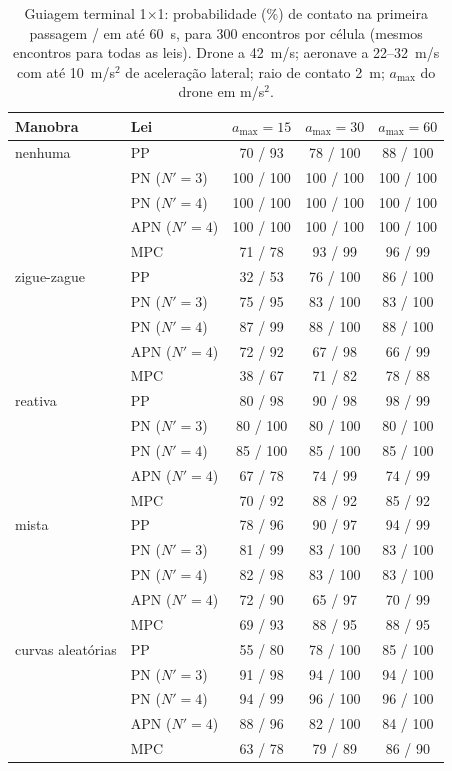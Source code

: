 \begin{table}[t]
\centering
\caption{Guiagem terminal 1$\times$1: probabilidade (\%) de contato na primeira passagem / em até 60~s, para
300 encontros por célula (mesmos encontros para todas as leis). Drone a 42~m/s; aeronave a 22--32~m/s com até
10~m/s$^2$ de aceleração lateral; raio de contato 2~m; $a_{\max}$ do drone em m/s$^2$.}
\label{tab:guiagem}
\small
\begin{tabular}{@{}llccc@{}}
\toprule
Manobra & Lei & $a_{\max}=15$ & $a_{\max}=30$ & $a_{\max}=60$ \\
\midrule
nenhuma & PP & 70 / 93 & 78 / 100 & 88 / 100 \\
 & PN ($N'{=}3$) & 100 / 100 & 100 / 100 & 100 / 100 \\
 & PN ($N'{=}4$) & 100 / 100 & 100 / 100 & 100 / 100 \\
 & APN ($N'{=}4$) & 100 / 100 & 100 / 100 & 100 / 100 \\
 & MPC & 71 / 78 & 93 / 99 & 96 / 99 \\
\midrule
zigue-zague & PP & 32 / 53 & 76 / 100 & 86 / 100 \\
 & PN ($N'{=}3$) & 75 / 95 & 83 / 100 & 83 / 100 \\
 & PN ($N'{=}4$) & 87 / 99 & 88 / 100 & 88 / 100 \\
 & APN ($N'{=}4$) & 72 / 92 & 67 / 98 & 66 / 99 \\
 & MPC & 38 / 67 & 71 / 82 & 78 / 88 \\
\midrule
reativa & PP & 80 / 98 & 90 / 98 & 98 / 99 \\
 & PN ($N'{=}3$) & 80 / 100 & 80 / 100 & 80 / 100 \\
 & PN ($N'{=}4$) & 85 / 100 & 85 / 100 & 85 / 100 \\
 & APN ($N'{=}4$) & 67 / 78 & 74 / 99 & 74 / 99 \\
 & MPC & 70 / 92 & 88 / 92 & 85 / 92 \\
\midrule
mista & PP & 78 / 96 & 90 / 97 & 94 / 99 \\
 & PN ($N'{=}3$) & 81 / 99 & 83 / 100 & 83 / 100 \\
 & PN ($N'{=}4$) & 82 / 98 & 83 / 100 & 83 / 100 \\
 & APN ($N'{=}4$) & 72 / 90 & 65 / 97 & 70 / 99 \\
 & MPC & 69 / 93 & 88 / 95 & 88 / 95 \\
\midrule
curvas aleatórias & PP & 55 / 80 & 78 / 100 & 85 / 100 \\
 & PN ($N'{=}3$) & 91 / 98 & 94 / 100 & 94 / 100 \\
 & PN ($N'{=}4$) & 94 / 99 & 96 / 100 & 96 / 100 \\
 & APN ($N'{=}4$) & 88 / 96 & 82 / 100 & 84 / 100 \\
 & MPC & 63 / 78 & 79 / 89 & 86 / 90 \\
\bottomrule
\end{tabular}
\end{table}
